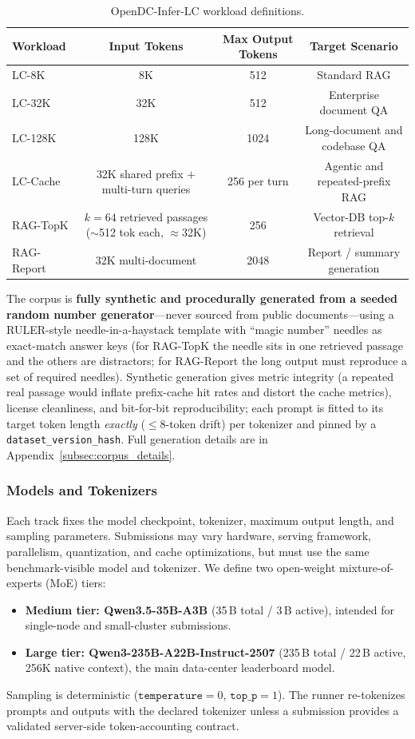 \begin{table}[t]
\centering
\small
\caption{OpenDC-Infer-LC workload definitions.}
\label{tab:workloads}
\begin{tabular}{lccc}
\toprule
\textbf{Workload} & \textbf{Input Tokens} & \textbf{Max Output Tokens} & \textbf{Target Scenario} \\
\midrule
LC-8K & 8K & 512 & Standard RAG \\
LC-32K & 32K & 512 & Enterprise document QA \\
LC-128K & 128K & 1024 & Long-document and codebase QA \\
LC-Cache & 32K shared prefix $+$ multi-turn queries & 256 per turn & Agentic and repeated-prefix RAG \\
\midrule
RAG-TopK & $k{=}64$ retrieved passages ($\sim$512 tok each, $\approx$32K) & 256 & Vector-DB top-$k$ retrieval \\
RAG-Report & 32K multi-document & 2048 & Report / summary generation \\
\bottomrule
\end{tabular}
\end{table}

The corpus is \textbf{fully synthetic and procedurally generated from a seeded
random number generator}---never sourced from public documents---using a
RULER-style needle-in-a-haystack template with ``magic number'' needles as
exact-match answer keys (for RAG-TopK the needle sits in one retrieved passage and
the others are distractors; for RAG-Report the long output must reproduce a set of
required needles). Synthetic generation gives metric integrity (a repeated real
passage would inflate prefix-cache hit rates and distort the cache metrics), license
cleanliness, and bit-for-bit reproducibility; each prompt is fitted to its target
token length \emph{exactly} ($\leq8$-token drift) per tokenizer and pinned by a
\texttt{dataset\_version\_hash}. Full generation details are in
Appendix~\ref{subsec:corpus_details}.

\subsubsection{Models and Tokenizers}
\label{subsec:model_selection}
Each track fixes the model checkpoint, tokenizer, maximum output length, and
sampling parameters. Submissions may vary hardware, serving framework, parallelism,
quantization, and cache optimizations, but must use the same benchmark-visible
model and tokenizer. We define two open-weight mixture-of-experts (MoE) tiers:
\begin{itemize}
    \item \textbf{Medium tier: Qwen3.5-35B-A3B} (35\,B total / 3\,B active),
    intended for single-node and small-cluster submissions.
    \item \textbf{Large tier: Qwen3-235B-A22B-Instruct-2507} (235\,B total /
    22\,B active, 256K native context), the main data-center leaderboard model.
\end{itemize}
Sampling is deterministic ($\texttt{temperature}{=}0$, $\texttt{top\_p}{=}1$). The
runner re-tokenizes prompts and outputs with the declared tokenizer unless a
submission provides a validated server-side token-accounting contract.

